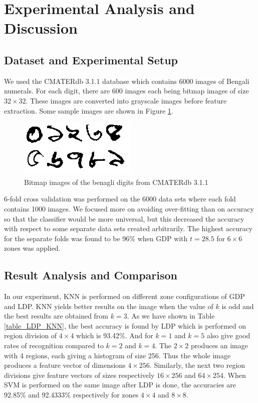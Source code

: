 \documentclass[conference]{IEEEtran}
\begin{document}
\section{Experimental Analysis and Discussion}

\subsection{Dataset and Experimental Setup}
We used the CMATERdb 3.1.1 \cite{2009cmater} database which contains 6000 images of Bengali numerals. For each digit, there are 600 images each being bitmap images of size $32 \times 32$. These images are converted into grayscale images before feature extraction. Some sample images are shown in Figure \ref{fig:bangladigits}.

\begin{figure}
	\includegraphics[width=\linewidth]{digits.png}
	\caption{Bitmap images of the benagli digits from CMATERdb 3.1.1}
	\label{fig:bangladigits}
\end{figure}

6-fold cross validation was performed on the 6000 data sets where each fold contains 1000 images. We focused more on avoiding over-fitting than on accuracy so that the classifier would be more universal, but this decreased the accuracy with respect to some separate data sets created arbitrarily. The highest accuracy for the separate folds was found to be 96\% when GDP with $t = 28.5$ for $6\times6$ zones was applied.

\subsection{Result Analysis and Comparison}
In our experiment, KNN is performed on different zone configurations of GDP and LDP. KNN yields better results on the image when the value of $k$ is odd and the best results are obtained from $k = 3$. As we have shown in Table \ref{table_LDP_KNN}, the best accuracy is found by LDP which is performed on region division of $4 \times 4$ which is 93.42\%. And for $k = 1$ and $k = 5$ also give good rates of recognition compared to $k = 2$ and $k = 4$. The $2\times2$ produces an image with 4 regions, each giving a histogram of size 256. Thus the whole image produces a feature vector of dimensions $4\times256$. Similarly, the next two region divisions give feature vectors of sizes respectively $16\times256$ and $64\times254$. When SVM is performed on the same image after LDP is done, the accuracies are 92.85\% and 92.4333\% respectively for zones $4\times4$ and $8\times8$. 
\end{document}
